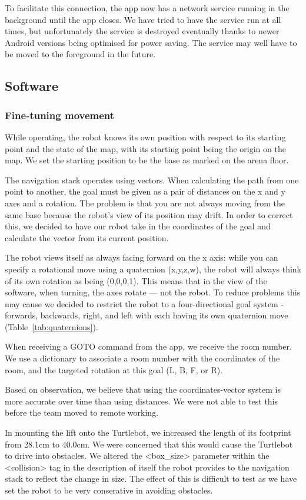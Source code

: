 \documentclass{article}
\begin{document}
To facilitate this connection, the app now has a network service running in the background until the app closes. We have tried to have the service run at all times, but unfortunately the service is destroyed eventually thanks to newer Android versions being optimised for power saving. The service may well have to be moved to the foreground in the future.
\subsection{Software}


\subsubsection{Fine-tuning movement}
While operating, the robot knows its own position with respect to its starting point and the state of the map, with its starting point being the origin on the map. We set the starting position to be the base as marked on the arena floor. 

The navigation stack operates using vectors. When calculating the path from one point to another, the goal must be given as a pair of distances on the x and y axes and a rotation. The problem is that you are not always moving from the same base because the robot's view of its position may drift. In order to correct this, we decided to have our robot take in the coordinates of the goal and calculate the vector from its current position.

The robot views itself as always facing forward on the x axis: while you can specify a rotational move using a quaternion (x,y,z,w), the robot will always think of its own rotation as being (0,0,0,1). This means that in the view of the software, when turning, the axes rotate --- not the robot. To reduce problems this may cause we decided to restrict the robot to a four-directional goal system - forwards, backwards, right, and left with each having its own quaternion move (Table~\ref{tab:quaternions}).

When receiving a GOTO command from the app, we receive the room number. We use a dictionary to associate a room number with the coordinates of the room, and the targeted rotation at this goal (L, B, F, or R).

Based on observation, we believe that using the coordinates-vector system is more accurate over time than using distances. We were not able to test this before the team moved to remote working. 

In mounting the lift onto the Turtlebot, we increased the length of its footprint from 28.1cm to 40.0cm. We were concerned that this would cause the Turtlebot to drive into obstacles. We altered the <box\_size> parameter within the <collision> tag in the description of itself the robot provides to the navigation stack to reflect the change in size. The effect of this is difficult to test as we have set the robot to be very conserative in avoiding obstacles. 
\end{document}
